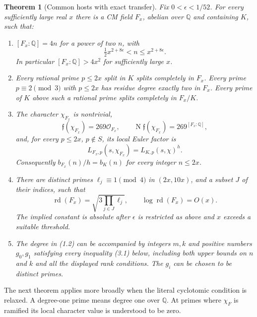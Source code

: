 \documentclass[11pt]{article}
\newtheorem{theorem}{Theorem}[section]
\theoremstyle{remark}\newtheorem{remark}[theorem]{Remark}
\newcommand{\Q}{\mathbb Q}
\newcommand{\rd}{\operatorname{rd}}
\newcommand{\N}{\operatorname N}
\begin{document}
\begin{theorem}[Common hosts with exact transfer]\label{thm:construction}
Fix $0<\epsilon<1/52$. For every sufficiently large real $x$ there
is a CM field $F_x$, abelian over $\Q$ and containing $K$, such that:
\begin{enumerate}
\item $[F_x:\Q]=4n$ for a power of two $n$, with
\[
 \tfrac12x^{2+8\epsilon}<n\le x^{2+8\epsilon}.
                                                        \tag{1.2}
\]
In particular $[F_x:\Q]>4x^2$ for sufficiently large $x$.
\item Every rational prime $p\le2x$ split in $K$ splits completely
in $F_x$. Every prime $p\equiv2\pmod3$ with $p\le2x$ has residue
degree exactly two in $F_x$. Every prime of $K$ above such a rational
prime splits completely in $F_x/K$.
\item The character $\chi_{F_x}$ is nontrivial,
\[
 \mathfrak f(\chi_{F_x})=269\mathcal O_{F_x},\qquad
 \N\mathfrak f(\chi_{F_x})=269^{[F_x:\Q]},
                                                        \tag{1.3}
\]
and, for every $p\le2x$, $p\notin S$, its local Euler factor is
\[
 L_{F_x,p}(s,\chi_{F_x})=L_{K,p}(s,\chi)^h.
                                                        \tag{1.4}
\]
Consequently $b_{F_x}(n)/h=b_K(n)$ for every integer $n\le2x$.
\item There are distinct primes $\ell_j\equiv1\pmod4$ in
$(2x,10x)$, and a subset $J$ of their indices, such that
\[
 \rd(F_x)=\sqrt{3\prod_{j\in J}\ell_j},\qquad
 \log\rd(F_x)=O(x).
                                                        \tag{1.5}
\]
The implied constant is absolute after $\epsilon$ is restricted as
above and $x$ exceeds a suitable threshold.
\item The degree in (1.2) can be accompanied by integers $m,k$ and
positive numbers $g_0,g_1$ satisfying every inequality (3.1) below,
including both upper bounds on $n$ and $k$ and all the displayed
rank conditions. The $g_i$ can be chosen to be distinct primes.
\end{enumerate}
\end{theorem}

The next theorem applies more broadly when the literal cyclotomic
condition is relaxed. A degree-one prime means degree one over $\Q$.
At primes where $\chi_F$ is ramified its local character value is
understood to be zero.
\end{document}
